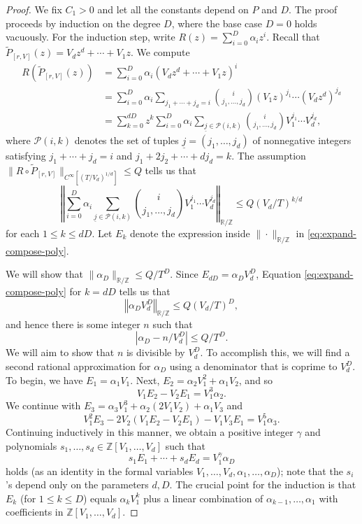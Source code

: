 \documentclass[11pt]{amsart}
\theoremstyle{definition}
\newcommand{\norm}[1]{\left\Vert #1\right\Vert}
\begin{document}
\begin{proof}
We fix $C_1>0$ and let all the constants depend on $P$ and $D$. The proof proceeds by induction on the degree $D$, where the base case $D=0$ holds vacuously. 
For the induction step, write $R(z)=\sum_{i=0}^D \alpha_i z^i$.  Recall that $\widetilde P_{[r, V]}(z)=V_d z^d+\cdots+V_1 z$.  We compute
\begin{align*}
R(\widetilde P_{[r, V]}(z)) &=\sum_{i = 0}^D \alpha_i (V_d z^d+\cdots +V_1 z)^i  \\
 &=\sum_{i = 0}^D \alpha_i \sum_{j_1+\cdots+j_d=i}\binom{i}{j_1, \ldots, j_d}(V_1z)^{j_1}\cdots (V_d z^d)^{j_d}\\
 &=\sum_{k=0}^{dD} z^k \sum_{i = 0}^D \alpha_i  \sum_{{\underline{j}} \in \mathcal{P}(i,k)}\binom{i}{j_1, \ldots, j_d}V_1^{j_1}\cdots V_d^{j_d},
\end{align*}
where $\mathcal{P}(i,k)$ denotes the set of tuples $\underline{j} = (j_1, \ldots, j_d)$ of nonnegative integers satisfying $j_1+\cdots+j_d=i$ and $j_1+2j_2+
\cdots+dj_d=k$.  The assumption $\|R \circ \widetilde P_{[r, V]}\|_{C^\infty [(T/V_d)^{1/d}]} \le Q$
tells us that
\begin{equation}\label{eq:expand-compose-poly}
\norm{\sum_{i = 0}^D \alpha_i  \sum_{{\underline{j}} \in \mathcal{P}(i,k)}\binom{i}{j_1, \ldots, j_d}V_1^{j_1}\cdots V_d^{j_d}}_{\mathbb{R}/\mathbb{Z}} \leq Q (V_d/T)^{k/d}
\end{equation}
for each $1 \leq k \leq dD$.  Let $E_k$ denote the expression inside $\| \cdot \|_{\mathbb{R}/\mathbb{Z}}$ in \eqref{eq:expand-compose-poly}.

We will show that $\|\alpha_D\|_{\mathbb{R}/\mathbb{Z}} \leq Q/T^D$.  
Since $E_{dD}=\alpha_D V_d^D$, Equation \eqref{eq:expand-compose-poly} for $k=dD$ tells us that
$$\norm{\alpha_D V_d^D}_{\mathbb{R}/\mathbb{Z}} \leq Q(V_d/T)^D,$$
and hence there is some integer $n$ such that
\begin{equation}\label{eq:fraction-comparison-first-estimate}
|\alpha_D-n/V_d^D| \leq Q/T^D.
\end{equation}
We will aim to show that $n$ is divisible by $V_d^D$.  To accomplish this, we will find a second rational approximation for $\alpha_D$ using a denominator that is coprime to $V_d^D$.  To begin, we have $E_1=\alpha_1V_1$.  Next, $E_2=\alpha_2 V_1^2+\alpha_1 V_2$, and so
$$V_1E_2-V_2E_1=V_1^3 \alpha_2.$$
We continue with $E_3=\alpha_3 V_1^3+\alpha_2(2V_1V_2)+\alpha_1 V_3$ and
$$V_1^2 E_3-2V_2(V_1E_2-V_2E_1)-V_1 V_3 E_1=V_1^5 \alpha_3.$$
Continuing inductively in this manner, we obtain a positive integer $\gamma$ and polynomials $s_1, \ldots, s_d \in \mathbb{Z}[V_1, \ldots, V_d]$ such that
$$s_1E_1+\cdots+s_dE_d=V_1^{\gamma}\alpha_D$$
holds (as an identity in the formal variables $V_1, \ldots, V_d, \alpha_1, \ldots, \alpha_D$); note that the $s_i$'s depend only on the parameters $d,D$.  The crucial point for the induction is that $E_k$ (for $1 \leq k \leq D$) equals $\alpha_k V_1^k$ plus a linear combination of $\alpha_{k-1}, \ldots, \alpha_1$ with coefficients in $\mathbb{Z}[V_1, \ldots, V_d]$.


\end{proof}
\end{document}
